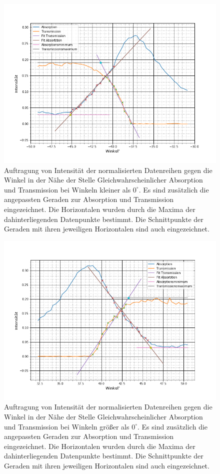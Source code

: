 \begin{figure}[h]
	\centering
	\label{si_1_l}
	\includegraphics[scale=0.5]{Bilder/si_1_l}
	\caption[Geraden Anpassungen erste Silizium Messung links]{\small Auftragung von Intensität der normalisierten Datenreihen gegen die  Winkel in der Nähe der Stelle Gleichwahrscheinlicher Absorption und Transmission bei Winkeln kleiner als $0^\circ$. Es sind zusätzlich die angepassten Geraden zur Absorption und Transmission eingezeichnet. Die Horizontalen wurden durch die Maxima der dahinterliegenden Datenpunkte bestimmt. Die Schnittpunkte der Geraden mit ihren jeweiligen Horizontalen sind auch eingezeichnet.}
\end{figure}

\begin{figure}[h]
	\centering
	\label{si_1_r}
	\includegraphics[scale=0.5]{Bilder/si_1_r}
	\caption[Geraden Anpassungen erste Silizium Messung rechts]{\small Auftragung von Intensität der normalisierten Datenreihen gegen die  Winkel in der Nähe der Stelle Gleichwahrscheinlicher Absorption und Transmission bei Winkeln größer als $0^\circ$. Es sind zusätzlich die angepassten Geraden zur Absorption und Transmission eingezeichnet. Die Horizontalen wurden durch die Maxima der dahinterliegenden Datenpunkte bestimmt. Die Schnittpunkte der Geraden mit ihren jeweiligen Horizontalen sind auch eingezeichnet.}
\end{figure}

